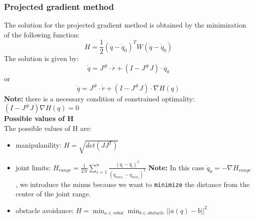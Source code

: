\documentclass[a4paper,12pt]{article}
\begin{document}
    \subsubsection{Projected gradient method}\label{sec:Projected gradient method}
    The solution for the projected gradient method is obtained by the minimization 
    of the following function:
    \begin{equation}
        H = \frac{1}{2} (\dot{q}-\dot{q}_0)^T W (\dot{q}-\dot{q}_0)
    \end{equation}
    The solution is
     given by:\begin{equation}
        \dot{q} = J^\# \cdot \dot{r} + (I - J^\# J) \cdot \dot{q}_0
    \end{equation} or \begin{equation}
        \dot{q} = J^\# \cdot \dot{r} + (I - J^\# J) \cdot \nabla H(q)
    \end{equation}
    \textbf{Note:} there is a necessary condition of constrained 
    optimality: $(I - J^\# J) \nabla H(q) = 0$\\
    \textbf{Possible values of H} \\
    The possible values of H are:
    \begin{itemize}
        \item manipulanility: $H = \sqrt{det(J J^T)}$
        \item joint limits: $H_{range} = \frac{1}{2N}\sum_{i=1}^{n} \frac{(q_i - \bar{q_i})^2}{(q_{max_i} - q_{min_i})^2}$
        \textbf{Note:} In this case $\dot{q}_0 = - \nabla H_{range}$, we introduce the minus because
        we want to \texttt{minimize} the distance from the center of the joint range.
        \item obstacle avoidance: $H = \min_{a \in robot } \min_{b \in obstacle} ||a(q) - b||^2$
    \end{itemize}
\end{document}
